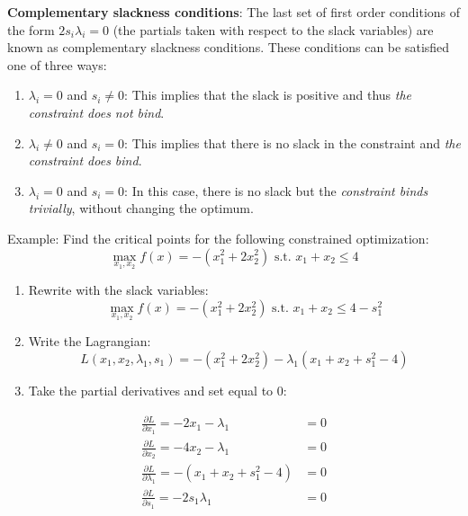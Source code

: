 \documentclass[
]{book}
\providecommand{\tightlist}{%
  \setlength{\itemsep}{0pt}\setlength{\parskip}{0pt}}
\theoremstyle{definition}
\theoremstyle{definition}
\theoremstyle{definition}
\theoremstyle{definition}
\theoremstyle{remark}
\begin{document}
\textbf{Complementary slackness conditions}: The last set of first order conditions of the form \(2s_i\lambda_i = 0\) (the partials taken with respect to the slack variables) are known as complementary slackness conditions. These conditions can be satisfied one of three ways:

\begin{enumerate}
\def\labelenumi{\arabic{enumi}.}
\tightlist
\item
  \(\lambda_i = 0\) and \(s_i \neq 0\): This implies that the slack is positive and thus \emph{the constraint does not bind}.
\item
  \(\lambda_i \neq 0\) and \(s_i = 0\): This implies that there is no slack in the constraint and \emph{the constraint does bind}.
\item
  \(\lambda_i = 0\) and \(s_i = 0\): In this case, there is no slack but the \emph{constraint binds trivially}, without changing the optimum.
\end{enumerate}

Example: Find the critical points for the following constrained optimization:
\[\max_{x_1,x_2} f(x) = -(x_1^2 + 2x_2^2) \text{ s.t. } x_1 + x_2 \le 4\]

\begin{enumerate}
\def\labelenumi{\arabic{enumi}.}
\item
  Rewrite with the slack variables:
  \[\max_{x_1,x_2} f(x) = -(x_1^2 + 2x_2^2) \text{ s.t. } x_1 + x_2 \le 4 - s_1^2\]
\item
  Write the Lagrangian:
  \[L(x_1,x_2,\lambda_1,s_1) = -(x_1^2 + 2x_2^2) - \lambda_1 (x_1 + x_2 + s_1^2 - 4)\]
\item
  Take the partial derivatives and set equal to 0:
\end{enumerate}

\begin{align*}
\frac{\partial L}{\partial x_1} = -2x_1 - \lambda_1  &= 0\\
\frac{\partial L}{\partial x_2}  = -4x_2 - \lambda_1 &=  0\\
\frac{\partial L}{\partial \lambda_1} = -(x_1 + x_2 + s_1^2 - 4)&= 0\\
\frac{\partial L}{\partial s_1} = -2s_1\lambda_1 &= 0\\
\end{align*}
\end{document}

